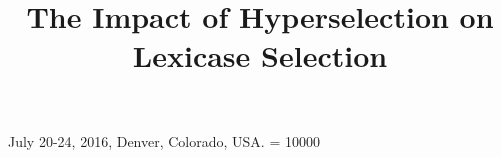 \documentclass{sig-alternate}
\begin{document}








%
 {July 20-24, 2016, Denver, Colorado, USA.}
\widowpenalty = 10000

\title{The Impact of Hyperselection on Lexicase Selection}

%
%
%
%
%
\end{document}
